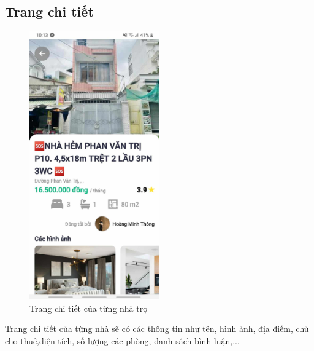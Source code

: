 \subsection{Trang chi tiết}
\begin{figure}[H]
    \centering
    \includegraphics[width=0.5\textwidth]{Images/app_image/app_12.jpg}
    \caption{Trang chi tiết của từng nhà trọ}
\end{figure}
Trang chi tiết của từng nhà sẽ có các thông tin như tên, hình ảnh, địa điểm, chủ cho thuê,diện tích, số lượng các phòng, danh sách bình luận,...
